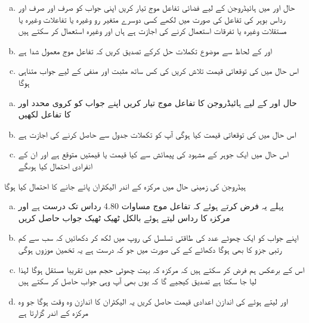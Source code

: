 \begin{enumerate}[a.]
\item
حال   اور  میں ہائیڈروجن کے لیے فضائی تفاعل موج  تیار کریں اپنی جواب کو صرف اور صرف    اور  رداس بوہر کی تفاعل کی صورت میں لکھے کسی دوسرے متغیر رو  وغیرہ یا تفاعلات   وغیرہ یا مستقلات   وغیرہ یا تفرقات استعمال کرنے کی اجازت ہے ہاں   اور  وغیرہ استعمال کر سکتے ہیں 
\item
{}  اور  کے لحاظ سے موضوع تکملات حل کرکے تصدیق کریں کہ تفاعل موج معمول شدا ہے 
\item
اس حال میں  کی توقعاتی قیمت تلاش کریں  کی کس ساتھ مثبت اور منفی کے لیے جواب متناہی ہوگا 
\end{enumerate}
\begin{enumerate}[a.]
\item
حال   اور  کے لیے ہائیڈروجن کا تفاعل موج تیار کریں اپنے جواب کو کروی محدد   اور  کا تفاعل لکھیں 
\item
 اس حال میں  کی توقعاتی قیمت کیا ہوگی آپ کو تکملات جدول سے حاصل کرنے کی اجازت ہے 
\item
اس حال میں ایک جوہر کے مشہود  کی پیمائش سے کیا قیمت یا قیمتیں متوقع ہے اور ان کے انفرادی احتمال کیا ہوںگے 
\end{enumerate}
ہیڈروجن کی زمینی حال میں مرکزہ کے اندر الیکٹران پائے جانے کا احتمال کیا ہوگا 
\begin{enumerate}[a.]
\item
پہلے یہ فرض کرتے ہوئے کہ تفاعل موج مساوات 4.80 رداس  تک درست ہے اور مرکزہ کا رداس  لیتے ہوئے بالکل ٹھیک ٹھیک جواب حاصل کریں 
\item
اپنے جواب کو ایک چھوٹے عدد  کی طاقتی تسلسل کی روپ میں لکھ کر دکھائیں کہ سب سے کم رتبی  جزو کا بھی ہوگا  دکھائے کے  کی صورت میں جو کہ درست ہے یہ تخمین موزوں ہوگی 
 \item
اس کے برعکس ہم فرض کر سکتے ہیں کہ مرکزہ کہ بہت چھوٹی حجم میں  تقریبا مستقل ہوگا لہذا  لیا جا سکتا ہے تصدیق کیجیے گا کہ یوں بھی آپ وہی جواب حاصل کر سکتے ہیں 
\item
{} اور  لیتے ہوئے  کی اندازن اعدادی قیمت حاصل کریں یہ الیکٹران کا اندازن وہ وقت ہوگا جو وہ مرکزہ کے اندر گزارتا ہے 
\end{enumerate}
